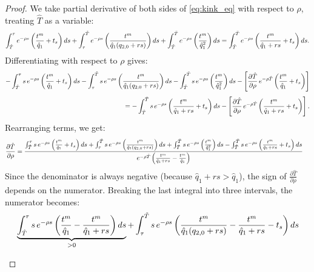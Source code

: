 \documentclass{article}
\theoremstyle{plain}
\theoremstyle{plain}
\begin{document}
\begin{proof}
We take partial derivative of both sides of \eqref{eq:kink_eq} with respect to $\rho$, treating $\hat{T}$ as a variable:
\[
\int_{\hat{T}}^{\tau}e^{-\rho s}\left(\frac{t^{m}_{}}{\hat{q}_{1}}+t_{s}\right)ds+\int_{\tau}^{\tilde{T}}e^{-\rho s}\left(\frac{t^{m}_{}}{\hat{q}_{1}(q_{2,0}+rs)}\right)ds+\int_{\tilde{T}}^{\bar{T}}e^{-\rho s}\left(\frac{t^{m}_{}}{\hat{q}_{1}^{2}}\right)ds=\int_{\hat{T}}^{\bar{T}}e^{-\rho s}\left(\frac{t^{m}_{}}{\hat{q}_{1}+rs}+t_{s}\right)ds.
\]
Differentiating with respect to $\rho$ gives: 
\begin{align*}
-\int_{\hat{T}}^{\tau} s\,e^{-\rho s}\left(\frac{t^{m}_{}}{\hat{q}_{1}}+t_{s}\right)ds 
-\int_{\tau}^{\tilde{T}} s\,e^{-\rho s}\left(\frac{t^{m}_{}}{\hat{q}_{1}(q_{2,0}+rs)}\right)ds 
-\int_{\tilde{T}}^{\bar{T}} s\,e^{-\rho s}\left(\frac{t^{m}_{}}{\hat{q}_{1}^{2}}\right)ds
-\left[\frac{\partial\hat{T}}{\partial\rho}\,e^{-\rho\hat{T}}\left(\frac{t^{m}_{}}{\hat{q}_{1}}+t_{s}\right)\right] \\[1ex]
= -\int_{\hat{T}}^{\bar{T}} s\,e^{-\rho s}\left(\frac{t^{m}_{}}{\hat{q}_{1}+rs}+t_{s}\right)ds
-\left[\frac{\partial\hat{T}}{\partial\rho}\,e^{-\rho\hat{T}}\left(\frac{t^{m}_{}}{\hat{q}_{1}+rs}+ t_{s}\right)\right].
\end{align*}
Rearranging terms, we get: 
\begin{align*}
\frac{\partial\hat{T}}{\partial\rho} & =\frac{\int_{\hat{T}}^{\tau} s\,e^{-\rho s}\left(\frac{t^{m}_{}}{\hat{q}_{1}}+t_{s}\right)ds+\int_{\tau}^{\tilde{T}} s\,e^{-\rho s}\left(\frac{t^{m}_{}}{\hat{q}_{1}(q_{2,0}+rs)}\right)ds+\int_{\tilde{T}}^{\bar{T}} s\,e^{-\rho s}\left(\frac{t^{m}_{}}{\hat{q}_{1}^{2}}\right)ds-\int_{\hat{T}}^{\bar{T}} s\,e^{-\rho s}\left(\frac{t^{m}_{}}{\hat{q}_{1}+rs}+t_{s}\right)ds}{e^{-\rho\hat{T}}\left(\frac{t^{m}_{}}{\hat{q}_{1}+rs}-\frac{t^{m}_{}}{\hat{q}_{1}}\right)}
\end{align*}
Since the denominator is always negative (because $\hat{q}_{1}+rs>\hat{q}_{1}$), the sign of $\frac{\partial\hat{T}}{\partial\rho}$ depends on the numerator.  
Breaking the last integral into three intervals, the numerator becomes:
\begin{align*}
 & \underbrace{\int_{\hat{T}}^{\tau} s\,e^{-\rho s} \left(\frac{\machinetime{}}{\hat{q}_{1}} - \frac{\machinetime{}}{\hat{q}_{1} + rs}\right) ds}_{>0} 
+ \int_{\tau}^{\tilde{T}} s\,e^{-\rho s} \left(\frac{\machinetime{}}{\hat{q}_{1}(q_{2,0} + rs)} - \frac{\machinetime{}}{\hat{q}_{1} + rs} - \handofftime{}\right) ds \\[1ex]

\end{align*}
\end{proof}
\end{document}
